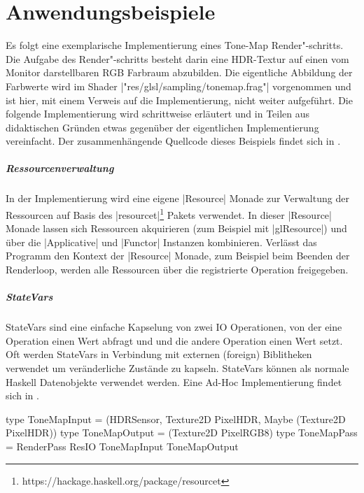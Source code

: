 \chapter{Anwendungsbeispiele}
\label{chap:anwendung}

Es folgt eine exemplarische Implementierung eines Tone-Map Render"-schritts. Die Aufgabe des Render"-schritts besteht darin eine HDR-Textur auf einen vom Monitor darstellbaren RGB Farbraum abzubilden. Die eigentliche Abbildung der Farbwerte wird im Shader |"res/glsl/sampling/tonemap.frag"| vorgenommen und ist hier, mit einem Verweis auf die Implementierung, nicht weiter aufgeführt. Die folgende Implementierung wird schrittweise erläutert und in Teilen aus didaktischen Gründen etwas gegenüber der eigentlichen Implementierung vereinfacht. Der zusammenhängende Quellcode dieses Beispiels findet sich in .

\paragraph{Ressourcenverwaltung} In der Implementierung wird eine eigene |Resource| Monade zur Verwaltung der Ressourcen auf Basis des |resourcet|\footnote{https://hackage.haskell.org/package/resourcet} Pakets verwendet. In dieser |Resource| Monade lassen sich Ressourcen akquirieren (zum Beispiel mit |glResource|) und über die |Applicative| und |Functor| Instanzen kombinieren. Verlässt das Programm den Kontext der |Resource| Monade, zum Beispiel beim Beenden der Renderloop, werden alle Ressourcen über die registrierte Operation freigegeben.

\paragraph{StateVars} StateVars sind eine einfache Kapselung von zwei IO Operationen, von der eine Operation einen Wert abfragt und und die andere Operation einen Wert setzt. Oft werden StateVars in Verbindung mit externen (foreign) Biblitheken verwendet um veränderliche Zustände zu kapseln. StateVars können als normale Haskell Datenobjekte verwendet werden. Eine Ad-Hoc Implementierung findet sich in .

\begin{haskell}[label={lst:tonemap-pass-sig},caption={\texttt{ToneMapPass} Signatur},nolol]
type ToneMapInput = (HDRSensor, Texture2D PixelHDR, Maybe (Texture2D PixelHDR))
type ToneMapOutput = (Texture2D PixelRGB8)
type ToneMapPass = RenderPass ResIO ToneMapInput ToneMapOutput
\end{haskell}

